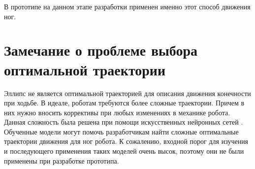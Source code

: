 В прототипе на данном этапе разработки применен именно этот способ движения ног.

\section{Замечание о проблеме выбора оптимальной траектории}

Эллипс не является оптимальной траекторией для описания движения конечности при ходьбе. В идеале, роботам требуются более сложные траектории. Причем в них нужно вносить коррективы при любых изменениях в механике робота. Данная сложность была решена при помощи искусственных нейронных сетей \cite{Singla2018}. Обученные модели могут помочь разработчикам найти сложные оптимальные траектории движения для ног робота. К сожалению, входной порог для изучения и последующего применения таких моделей очень высок, поэтому они не были применены при разработке прототипа.